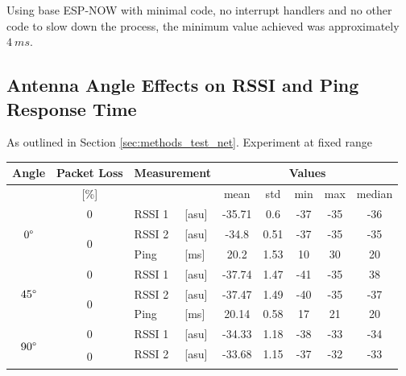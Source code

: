 Using base ESP-NOW with minimal code, no interrupt handlers and no other code to slow down the process, the minimum value achieved was approximately $4\ ms$.


\subsection{\label{sec:res_angle}Antenna Angle Effects on RSSI and Ping Response Time}

As outlined in Section \ref{sec:methods_test_net}. Experiment at fixed range

\begin{table}[H]
    \centering
    \begin{tabular}{|c|c|l|l|c|c|c|c|c|}
    \hline
        Angle & Packet Loss & \multicolumn{2}{l|}{Measurement} & \multicolumn{5}{c|}{Values} \\\hline
        [\degree] & [\%] & \multicolumn{2}{l|}{} & mean & std & min & max & median \\\hline\hline
        \multirow{3}{*}{$0\degree$} & \multirow{1}{*}{0} & RSSI 1 & [asu] & -35.71 & 0.6 & -37 & -35 & -36 \\\cline{2-9}\cline{2-9}
        & \multirow{2}{*}{0} & RSSI 2 & [asu] & -34.8 & 0.51 & -37 & -35 & -35 \\\cline{3-9}
        && Ping & [ms] & 20.2 & 1.53 & 10 & 30 & 20 \\\hline\hline
        \multirow{3}{*}{$45\degree$} & \multirow{1}{*}{0} & RSSI 1 & [asu] & -37.74 & 1.47 & -41 & -35 & 38 \\\cline{2-9}\cline{2-9}
        & \multirow{2}{*}{0} & RSSI 2 & [asu] & -37.47 &1.49 & -40 & -35 & -37 \\\cline{3-9}
        && Ping & [ms] & 20.14 & 0.58 & 17 & 21 & 20 \\\hline\hline
        \multirow{3}{*}{$90\degree$} & \multirow{1}{*}{0} & RSSI 1 & [asu] & -34.33 & 1.18 & -38 & -33 & -34 \\\cline{2-9}\cline{2-9}
        & \multirow{2}{*}{0} & RSSI 2 & [asu] & -33.68 & 1.15 & -37 & -32 & -33 \\\cline{3-9}

\end{tabular}
\end{table}
